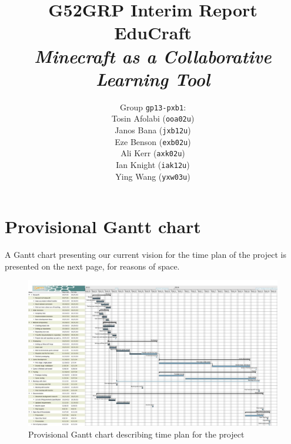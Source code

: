 \documentclass[11pt,a4paper]{report}
\begin{document}
\title{{\normalsize G52GRP Interim Report}\\EduCraft\\\textit{Minecraft as a Collaborative Learning Tool}}
\author{Group \texttt{gp13-pxb1}:\\
            Tosin Afolabi (\texttt{ooa02u})\\
            Janos Bana (\texttt{jxb12u})\\
            Eze Benson (\texttt{exb02u})\\
            Ali Kerr (\texttt{axk02u})\\
            Ian Knight (\texttt{iak12u})\\
            Ying Wang (\texttt{yxw03u})
            }
\maketitle

\tableofcontents








\appendix
\chapter{Provisional Gantt chart}
\label{apdx:gantt}
A Gantt chart presenting our current vision for the time plan of the project is presented
on the next page, for reasons of space.

\begin{landscape}
\begin{figure}
\caption{Provisional Gantt chart describing time plan for the project}
\includegraphics[width=24cm]{interim_gantt_chart}
\end{figure}
\end{landscape}


\end{document}
